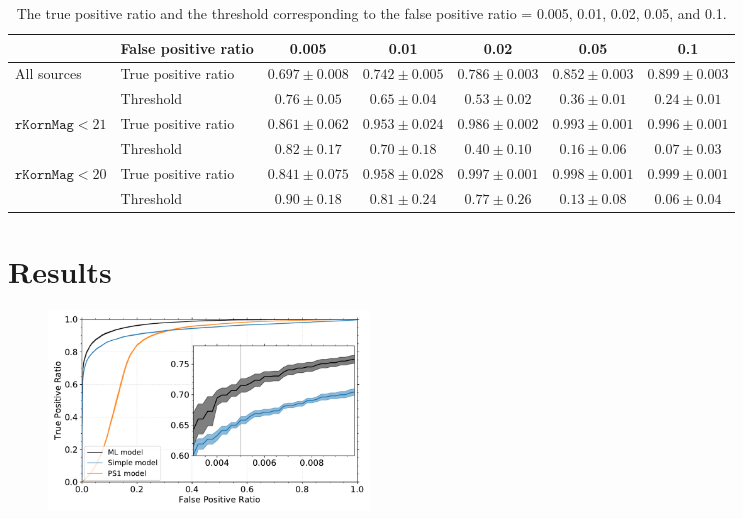 \documentclass[twocolumn]{aastex62}
\begin{document}
\begin{table}
\begin{center}
\caption{The true positive ratio and the threshold 
corresponding to the false positive ratio = 0.005, 0.01, 0.02, 0.05, and 0.1. }
\label{tbl:fpr}
\begin{tabular}{llccccc}
\hline\hline
                                                 & False positive ratio & 0.005 & 0.01 & 0.02 & 0.05 & 0.1 \\ \hline
\multicolumn{1}{l}{\multirow{2}{*}{All sources}} & True positive ratio  & $0.697 \pm 0.008$ &  $0.742 \pm 0.005$ & $0.786 \pm 0.003$ & $0.852 \pm 0.003$ & $0.899 \pm 0.003$  \\
\multicolumn{1}{l}{}                             & Threshold & $0.76 \pm 0.05$ &  $0.65 \pm 0.04$ & $0.53 \pm 0.02$ & $0.36 \pm 0.01$ & $0.24 \pm 0.01$  \\ \hline
\multirow{2}{*}{$\mathtt{rKornMag} < 21$} & True positive ratio  & $0.861 \pm 0.062$ &  $0.953 \pm 0.024$ & $0.986 \pm 0.002$ & $0.993 \pm 0.001$ & $0.996 \pm 0.001$ \\
                                                 & Threshold & $0.82 \pm 0.17$ &  $0.70 \pm 0.18$ & $0.40 \pm 0.10$ & $0.16 \pm 0.06$ & $0.07 \pm 0.03$   \\ \hline
\multirow{2}{*}{$\mathtt{rKornMag} < 20$}  & True positive ratio  & $0.841 \pm 0.075$ &  $0.958 \pm 0.028$ & $0.997 \pm 0.001$ & $0.998 \pm 0.001$ & $0.999 \pm 0.001$  \\
                                                  & Threshold & $0.90 \pm 0.18$ &  $0.81 \pm 0.24$ & $0.77 \pm 0.26$ & $0.13 \pm 0.08$ & $0.06 \pm 0.04$ \\ \hline
\end{tabular}
\end{center}
\end{table}

\section{Results}

\begin{figure}[t]
 \centering
  \includegraphics[width=3.35in, bb = 0 0 576 360]{./Figures/CV_ROC_HST.pdf}
  \caption{}
  \label{fig:cvroc_hst}
\end{figure}
\end{document}
